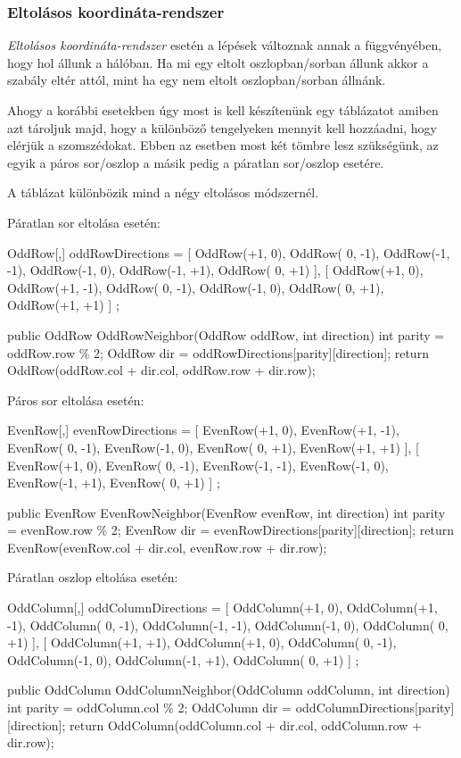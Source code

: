 \subsubsection{Eltolásos koordináta-rendszer}

\textit{Eltolásos koordináta-rendszer} esetén a lépések változnak annak a függvényében, hogy hol állunk a hálóban. Ha mi egy eltolt oszlopban/sorban állunk akkor a szabály eltér attól, mint ha egy nem eltolt oszlopban/sorban állnánk.

Ahogy a korábbi esetekben úgy most is kell készítenünk egy táblázatot amiben azt tároljuk majd, hogy a különböző tengelyeken mennyit kell hozzáadni, hogy elérjük a szomszédokat. Ebben az esetben most két tömbre lesz szükségünk, az egyik a páros sor/oszlop a másik pedig a páratlan sor/oszlop esetére.

A táblázat különbözik mind a négy eltolásos módszernél.

\bigskip

Páratlan sor eltolása esetén:
\begin{cpp}
OddRow[,] oddRowDirections = 
{ 
   [ 
      OddRow(+1,  0), OddRow( 0, -1), OddRow(-1, -1),
      OddRow(-1,  0), OddRow(-1, +1), OddRow( 0, +1) 
   ],
   [ 
      OddRow(+1,  0), OddRow(+1, -1), OddRow( 0, -1),
      OddRow(-1,  0), OddRow( 0, +1), OddRow(+1, +1) 
   ]
};

public OddRow OddRowNeighbor(OddRow oddRow, int direction)
{
   int parity = oddRow.row \% 2;
   OddRow dir = oddRowDirections[parity][direction];
   return OddRow(oddRow.col + dir.col, oddRow.row + dir.row);
}   
\end{cpp}

Páros sor eltolása esetén:
\begin{cpp}  
EvenRow[,] evenRowDirections = 
{ 
   [
      EvenRow(+1,  0), EvenRow(+1, -1), EvenRow( 0, -1),
      EvenRow(-1,  0), EvenRow( 0, +1), EvenRow(+1, +1) 
   ],
   [ 
      EvenRow(+1,  0), EvenRow( 0, -1), EvenRow(-1, -1),
      EvenRow(-1,  0), EvenRow(-1, +1), EvenRow( 0, +1) 
   ]
};

public EvenRow EvenRowNeighbor(EvenRow evenRow, int direction)
{
   int parity = evenRow.row \% 2;
   EvenRow dir = evenRowDirections[parity][direction];
   return EvenRow(evenRow.col + dir.col, evenRow.row + dir.row);
}   
\end{cpp}

Páratlan oszlop eltolása esetén:
\begin{cpp}
OddColumn[,] oddColumnDirections = 
{ 
   [ 
      OddColumn(+1,  0), OddColumn(+1, -1), OddColumn( 0, -1),
      OddColumn(-1, -1), OddColumn(-1,  0), OddColumn( 0, +1) 
   ],
   [ 
      OddColumn(+1, +1), OddColumn(+1,  0), OddColumn( 0, -1),
      OddColumn(-1,  0), OddColumn(-1, +1), OddColumn( 0, +1) 
   ]
};

public OddColumn OddColumnNeighbor(OddColumn oddColumn, int direction)
{
   int parity = oddColumn.col \% 2;
   OddColumn dir = oddColumnDirections[parity][direction];
   return OddColumn(oddColumn.col + dir.col, oddColumn.row + dir.row);
}   
\end{cpp}

